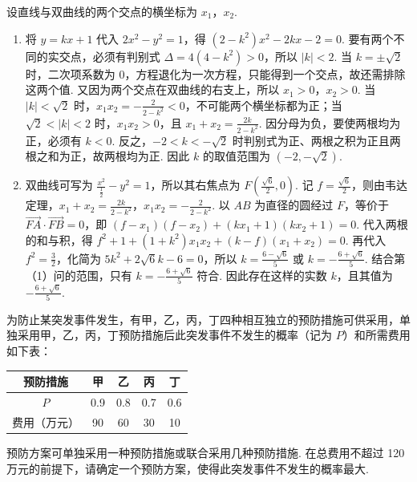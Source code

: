 \begin{solution}
设直线与双曲线的两个交点的横坐标为 \(x_1\)，\(x_2\).

\begin{enumerate}
\item 将 \(y=kx+1\) 代入 \(2x^2-y^2=1\)，得 \((2-k^2)x^2-2kx-2=0\). 要有两个不同的实交点，必须有判别式 \(\Delta=4(4-k^2)>0\)，所以 \(|k|<2\). 当 \(k=\pm\sqrt{2}\) 时，二次项系数为 \(0\)，方程退化为一次方程，只能得到一个交点，故还需排除这两个值. 又因为两个交点在双曲线的右支上，所以 \(x_1>0\)，\(x_2>0\). 当 \(|k|<\sqrt{2}\) 时，\(x_1x_2=-\frac{2}{2-k^2}<0\)，不可能两个横坐标都为正；当 \(\sqrt{2}<|k|<2\) 时，\(x_1x_2>0\)，且 \(x_1+x_2=\frac{2k}{2-k^2}\). 因分母为负，要使两根均为正，必须有 \(k<0\). 反之，\(-2<k<-\sqrt{2}\) 时判别式为正、两根之积为正且两根之和为正，故两根均为正. 因此 \(k\) 的取值范围为 \((-2,-\sqrt{2})\).
\item 双曲线可写为 \(\frac{x^2}{\frac{1}{2}}-y^2=1\)，所以其右焦点为 \(F\left(\frac{\sqrt{6}}{2},0\right)\). 记 \(f=\frac{\sqrt{6}}{2}\)，则由韦达定理，\(x_1+x_2=\frac{2k}{2-k^2}\)，\(x_1x_2=-\frac{2}{2-k^2}\). 以 \(AB\) 为直径的圆经过 \(F\)，等价于 \(\overrightarrow{FA}\cdot\overrightarrow{FB}=0\)，即
\(\left(f-x_1\right)\left(f-x_2\right)+\left(kx_1+1\right)\left(kx_2+1\right)=0\).
代入两根的和与积，得 \(f^2+1+(1+k^2)x_1x_2+(k-f)(x_1+x_2)=0\). 再代入 \(f^2=\frac{3}{2}\)，化简为 \(5k^2+2\sqrt{6}k-6=0\)，所以 \(k=\frac{6-\sqrt{6}}{5}\) 或 \(k=-\frac{6+\sqrt{6}}{5}\). 结合第（1）问的范围，只有 \(k=-\frac{6+\sqrt{6}}{5}\) 符合. 因此存在这样的实数 \(k\)，且其值为 \(-\frac{6+\sqrt{6}}{5}\).
\end{enumerate}
\end{solution}

\begin{problem}
为防止某突发事件发生，有甲，乙，丙，丁四种相互独立的预防措施可供采用，单独采用甲，乙，丙，丁预防措施后此突发事件不发生的概率（记为 \(P\)）和所需费用如下表：

\begin{center}
\begin{tabular}{|c|c|c|c|c|}
\hline
预防措施 & 甲 & 乙 & 丙 & 丁 \\
\hline
\(P\) & 0.9 & 0.8 & 0.7 & 0.6 \\
\hline
费用（万元） & 90 & 60 & 30 & 10 \\
\hline
\end{tabular}
\end{center}

预防方案可单独采用一种预防措施或联合采用几种预防措施. 在总费用不超过 120 万元的前提下，请确定一个预防方案，使得此突发事件不发生的概率最大.
\end{problem}

